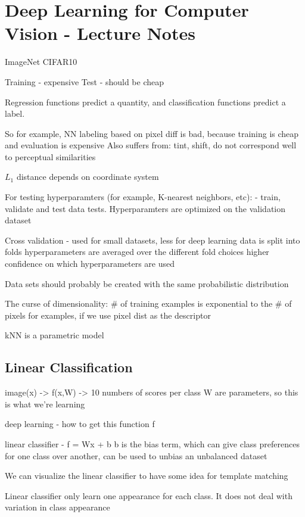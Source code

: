 \section{Deep Learning for Computer Vision - Lecture Notes}

ImageNet
CIFAR10

Training - expensive
Test - should be cheap 

Regression functions predict a quantity, and classification functions predict a label.

So for example, NN labeling based on pixel diff is bad, because training is cheap and evaluation is expensive
Also suffers from: tint, shift, do not correspond well to perceptual similarities

$L_1$ distance depends on coordinate system 

For testing hyperparamters (for example, K-nearest neighbors, etc):
- train, validate and test data tests. Hyperparamters are optimized on the validation dataset

Cross validation - 
used for small datasets, less for deep learning
data is split into folds
hyperparameters are averaged over the different fold choices
higher confidence on which hyperparameters are used

Data sets should probably be created with the same probabilistic distribution

The curse of dimensionality:
\# of training examples is exponential to the \# of pixels for examples, if we use pixel dist as the descriptor

kNN is a parametric model

\subsection{Linear Classification}

image(x) -> f(x,W) -> 10 numbers of scores per class
W are parameters, so this is what we're learning

deep learning - how to get this function f

linear classifier - f = Wx + b 
b is the bias term, which can give class preferences for one class over another, can be used to unbias an unbalanced dataset

We can visualize the linear classifier to have some idea for template matching

Linear classifier only learn one appearance for each class. It does not deal with variation in class appearance


